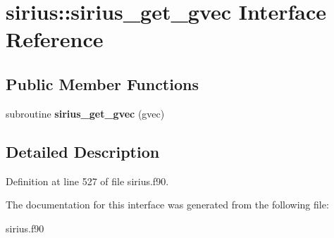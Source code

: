 \hypertarget{interfacesirius_1_1sirius__get__gvec}{}\section{sirius\+:\+:sirius\+\_\+get\+\_\+gvec Interface Reference}
\label{interfacesirius_1_1sirius__get__gvec}
\subsection*{Public Member Functions}
\begin{DoxyCompactItemize}
\item 
\hypertarget{interfacesirius_1_1sirius__get__gvec_a4bf47f8b93e8c14e6e0ddc8863378658}{}subroutine {\bfseries sirius\+\_\+get\+\_\+gvec} (gvec)\label{interfacesirius_1_1sirius__get__gvec_a4bf47f8b93e8c14e6e0ddc8863378658}

\end{DoxyCompactItemize}


\subsection{Detailed Description}


Definition at line 527 of file sirius.\+f90.



The documentation for this interface was generated from the following file\+:\begin{DoxyCompactItemize}
\item 
sirius.\+f90\end{DoxyCompactItemize}
